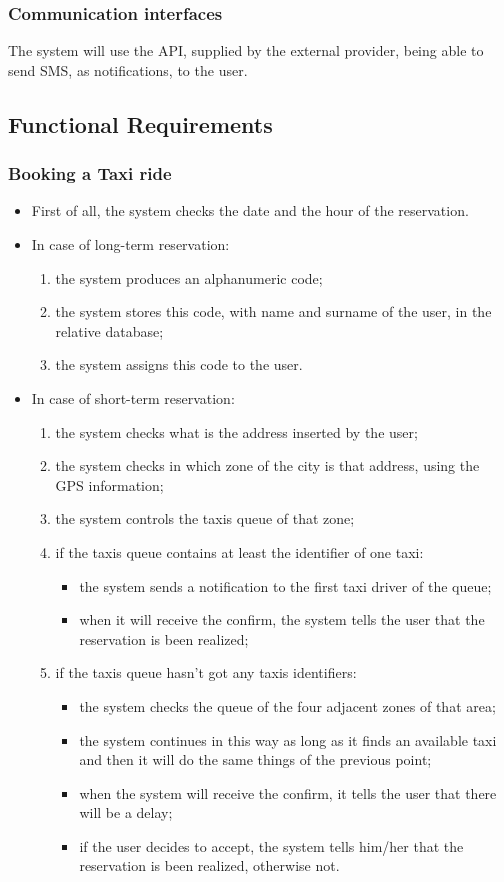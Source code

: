 		\subsubsection{Communication interfaces}
			The system will use the API, supplied by the external provider, being able to send SMS, as notifications, to the user. 
		\subsection{Functional Requirements}
		\subsubsection{Booking a Taxi ride}
		\begin{itemize}
			\item First of all, the system checks the date and the hour of the reservation. 
			\item In case of long-term reservation:
		\begin{enumerate}
			\item the system produces an alphanumeric code;
			\item the system stores this code, with name and surname of the user, in the relative database;
			\item the system assigns this code to the user.
		\end{enumerate}
			\item In case of short-term reservation:
		\begin{enumerate}
			\item the system checks what is the address inserted by the user;
			\item the system checks in which zone of the city is that address, using the GPS information;
			\item the system controls the taxis queue of that zone;
			\item if the taxis queue contains at least the identifier of one taxi:
				\begin{itemize}
					\item the system sends a notification to the first taxi driver of the queue;
					\item when it will receive the confirm, the system tells the user that the reservation is been realized;
				\end{itemize}	  
			\item if the taxis queue hasn't got any taxis identifiers:
				\begin{itemize}
					\item the system checks the queue of the four adjacent zones of that area;
					\item the system continues in this way as long as it finds an available taxi and then it will do the same things of the previous point;
					\item when the system will receive the confirm, it tells the user that there will be a delay;
					\item if the user decides to accept, the system tells him/her that the reservation is been realized, otherwise not.
				\end{itemize}
		\end{enumerate}
		\end{itemize}
